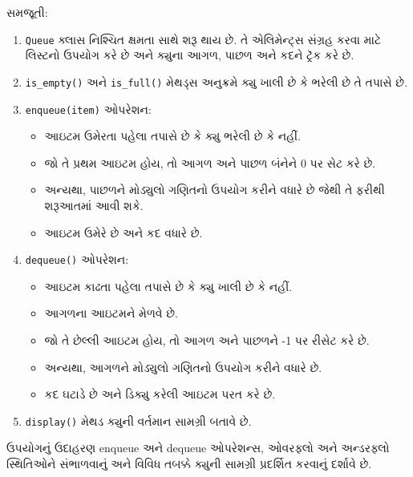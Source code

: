 સમજૂતી:

\begin{enumerate}
\def\labelenumi{\arabic{enumi}.}
\item
  \texttt{Queue} ક્લાસ નિશ્ચિત ક્ષમતા સાથે શરૂ થાય છે. તે એલિમેન્ટ્સ સંગ્રહ કરવા માટે
  લિસ્ટનો ઉપયોગ કરે છે અને ક્યુના આગળ, પાછળ અને કદને ટ્રૅક કરે છે.
\item
  \texttt{is\_empty()} અને \texttt{is\_full()} મેથડ્સ અનુક્રમે ક્યુ ખાલી છે કે
  ભરેલી છે તે તપાસે છે.
\item
  \texttt{enqueue(item)} ઓપરેશન:

  \begin{itemize}
  \tightlist
  \item
    આઇટમ ઉમેરતા પહેલા તપાસે છે કે ક્યુ ભરેલી છે કે નહીં.
  \item
    જો તે પ્રથમ આઇટમ હોય, તો આગળ અને પાછળ બંનેને 0 પર સેટ કરે છે.
  \item
    અન્યથા, પાછળને મોડ્યુલો ગણિતનો ઉપયોગ કરીને વધારે છે જેથી તે ફરીથી શરૂઆતમાં આવી
    શકે.
  \item
    આઇટમ ઉમેરે છે અને કદ વધારે છે.
  \end{itemize}
\item
  \texttt{dequeue()} ઓપરેશન:

  \begin{itemize}
  \tightlist
  \item
    આઇટમ કાઢતા પહેલા તપાસે છે કે ક્યુ ખાલી છે કે નહીં.
  \item
    આગળના આઇટમને મેળવે છે.
  \item
    જો તે છેલ્લી આઇટમ હોય, તો આગળ અને પાછળને -1 પર રીસેટ કરે છે.
  \item
    અન્યથા, આગળને મોડ્યુલો ગણિતનો ઉપયોગ કરીને વધારે છે.
  \item
    કદ ઘટાડે છે અને ડિક્યુ કરેલી આઇટમ પરત કરે છે.
  \end{itemize}
\item
  \texttt{display()} મેથડ ક્યુની વર્તમાન સામગ્રી બતાવે છે.
\end{enumerate}

ઉપયોગનું ઉદાહરણ enqueue અને dequeue ઓપરેશન્સ, ઓવરફ્લો અને અન્ડરફ્લો સ્થિતિઓને
સંભાળવાનું અને વિવિધ તબક્કે ક્યુની સામગ્રી પ્રદર્શિત કરવાનું દર્શાવે છે.

\begin{Shaded}
\begin{Highlighting}[]
\end{Highlighting}
\end{Shaded}

